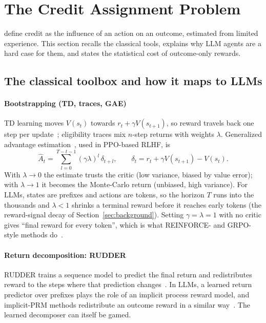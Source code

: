 \section{The Credit Assignment Problem}\label{sec:problem}

\citet{pignatelli2024survey} define credit as the influence of an action on an outcome, estimated from limited experience. This section recalls the classical tools, explains why LLM agents are a hard case for them, and states the statistical cost of outcome-only rewards.

\subsection{The classical toolbox and how it maps to LLMs}

\paragraph{Bootstrapping (TD, traces, GAE)}
TD learning moves $V(s_t)$ towards $r_t+\gamma V(s_{t+1})$, so reward travels back one step per update~\citep{sutton1988learning,sutton2018reinforcement}; eligibility traces mix $n$-step returns with weights $\lambda$. Generalized advantage estimation~\citep{schulman2015high}, used in PPO-based RLHF, is
\begin{equation}
  \hat A_t=\sum_{l=0}^{T-t-1}(\gamma\lambda)^l\,\delta_{t+l},\qquad
  \delta_t=r_t+\gamma V(s_{t+1})-V(s_t).
  \label{eq:gae}
\end{equation}
With $\lambda\to 0$ the estimate trusts the critic (low variance, biased by value error); with $\lambda\to1$ it becomes the Monte-Carlo return (unbiased, high variance). For LLMs, states are prefixes and actions are tokens, so the horizon $T$ runs into the thousands and $\lambda<1$ shrinks a terminal reward before it reaches early tokens (the reward-signal decay of Section~\ref{sec:background}). Setting $\gamma=\lambda=1$ with no critic gives ``final reward for every token'', which is what REINFORCE- and GRPO-style methods do~\citep{hu2025reinforce,shao2024deepseekmath}.

\paragraph{Return decomposition: RUDDER}
RUDDER trains a sequence model to predict the final return and redistributes reward to the steps where that prediction changes~\citep{arjonamedina2019rudder}. In LLMs, a learned return predictor over prefixes plays the role of an implicit process reward model, and implicit-PRM methods redistribute an outcome reward in a similar way~\citep{cui2025process}\unverified. The learned decomposer can itself be gamed.


